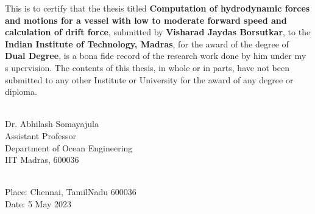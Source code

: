\certificate


This is to certify that the thesis titled {\bf  Computation of hydrodynamic forces and motions 
for a vessel with low to moderate forward speed and calculation of drift force}, 
submitted by {\bf Visharad Jaydas Borsutkar}, to the
 {\bf Indian Institute of Technology, Madras}, for the award of the degree of 
 {\bf Dual Degree}, is a bona fide record of the research work done by him under my s
 upervision. The contents of this thesis, in whole or in parts, have not been submitted 
 to any other Institute or University for the award of any degree or diploma.
\\[3cm]


\begin{singlespacing}
    \hspace*{-0.25in}
    \parbox{2.5in}{
    \\[0.25cm]
    \noindent Dr. Abhilash Somayajula \\ [0.15cm]
    \noindent Assistant Professor \\[0.15cm]
    \noindent Department of Ocean Engineering\\[0.15cm]
    \noindent IIT Madras, 600036
    } 
\end{singlespacing}
\\[2cm]


\noindent Place: Chennai, TamilNadu 600036\\
Date: 5 May 2023  